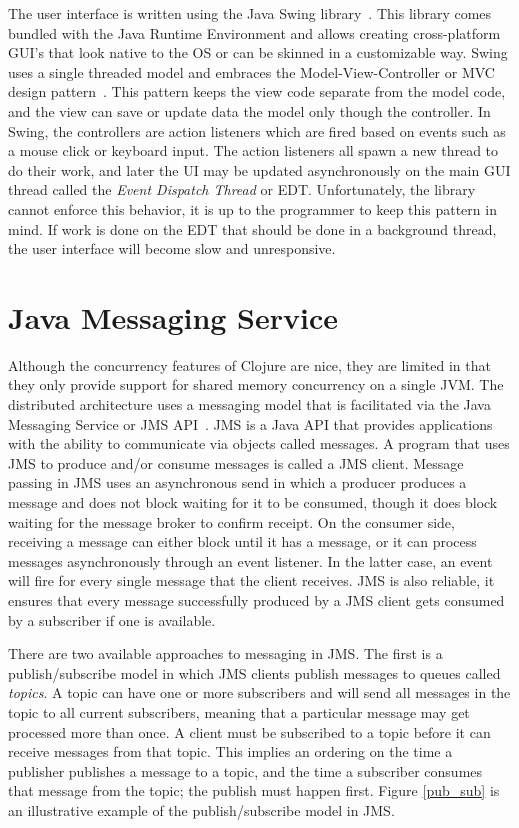 The user interface is written using the Java Swing library~\cite{swing}. 
This library comes bundled with the Java Runtime Environment and allows creating cross-platform GUI's that look native to the OS or can be skinned in a customizable way. 
Swing uses a single threaded model and embraces the Model-View-Controller or MVC design pattern~\cite{mvc}. 
This pattern keeps the view code separate from the model code, and the view can save or update data the model only though the controller. 
In Swing, the controllers are action listeners which are fired based on events such as a mouse click or keyboard input. 
The action listeners all spawn a new thread to do their work, and later the UI may be updated asynchronously on the main GUI thread called the {\it Event Dispatch Thread} or EDT.
Unfortunately, the library cannot enforce this behavior, it is up to the programmer to keep this pattern in mind.
If work is done on the EDT that should be done in a background thread, the user interface will become slow and unresponsive. 

\section{Java Messaging Service}
Although the concurrency features of Clojure are nice, they are limited in that they only provide support for shared memory concurrency on a single JVM. 
The distributed architecture uses a messaging model that is facilitated via the Java Messaging Service or JMS API~\cite{jms}.
JMS is a Java API that provides applications with the ability to communicate via objects called messages.
A program that uses JMS to produce and/or consume messages is called a JMS client.
Message passing in JMS uses an asynchronous send in which a producer produces a message and does not block waiting for it to be consumed, though it does block waiting for the message broker to confirm receipt.
On the consumer side, receiving a message can either block until it has a message, or it can process messages asynchronously through an event listener.
In the latter case, an event will fire for every single message that the client receives.
JMS is also reliable, it ensures that every message successfully produced by a JMS client gets consumed by a subscriber if one is available.

There are two available approaches to messaging in JMS.
The first is a publish/subscribe model in which JMS clients publish messages to queues called {\it topics}.
A topic can have one or more subscribers and will send all messages in the topic to all current subscribers, meaning that a particular message may get processed more than once.
A client must be subscribed to a topic before it can receive messages from that topic.
This implies an ordering on the time a publisher publishes a message to a topic, and the time a subscriber consumes that message from the topic; the publish must happen first.
Figure \ref{pub_sub} is an illustrative example of the publish/subscribe model in JMS.

